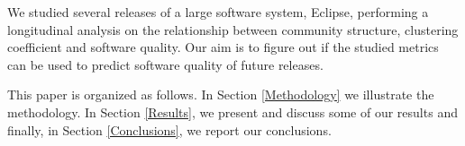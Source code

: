 We studied several releases of a large software system, Eclipse, performing a longitudinal analysis 
on the relationship between community structure, clustering coefficient and software quality. 
Our aim is to figure out if the studied metrics can be used to predict software quality of future releases.

This paper is organized as follows. In Section \ref{Methodology} we illustrate the methodology. In Section \ref{Results}, we present and discuss some of our results 
and finally, in Section \ref{Conclusions}, we report our conclusions.
% 

